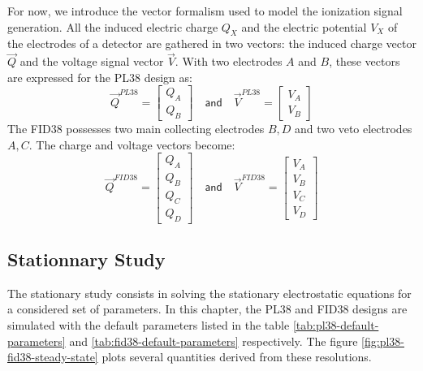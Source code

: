 For now, we introduce the vector formalism used to model the ionization signal generation. All the induced electric charge $Q_X$ and the electric potential $V_X$ of the electrodes of a detector are gathered in two vectors: the induced charge vector $\vec{Q}$ and the voltage signal vector $\vec{V}$. With two electrodes $A$ and $B$, these vectors are expressed for the PL38 design as:
\begin{equation}
\vec{Q}^{PL38} =
\begin{bmatrix}
Q_{A} \\ Q_{B}
\end{bmatrix}
\quad
\textsf{and}
\quad
\vec{V}^{PL38} =
\begin{bmatrix}
V_{A} \\ V_{B}
\end{bmatrix}
\end{equation}
The FID38 possesses two main collecting electrodes $B, D$ and two veto electrodes $A, C$. The charge and voltage vectors become:
\begin{equation}
\vec{Q}^{FID38} =
\begin{bmatrix}
Q_{A} \\ Q_{B} \\ Q_{C} \\ Q_{D}
\end{bmatrix}
\quad
\textsf{and}
\quad
\vec{V}^{FID38} =
\begin{bmatrix}
V_{A} \\ V_{B} \\ V_{C} \\ V_{D}
\end{bmatrix}
\end{equation}


\subsection{Stationnary Study}
\label{par:stationnary-study}
\label{par:fiducial-volume}

The stationary study consists in solving the stationary electrostatic equations for a considered set of parameters. In this chapter, the PL38 and FID38 designs are simulated with the default parameters listed in the table \ref{tab:pl38-default-parameters} and \ref{tab:fid38-default-parameters} respectively. The figure \ref{fig:pl38-fid38-steady-state} plots several quantities derived from these resolutions.

